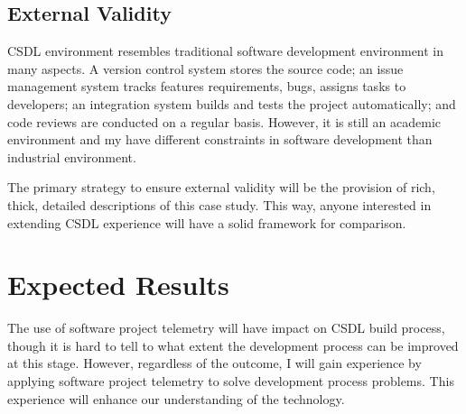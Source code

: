 \subsection{External Validity}

CSDL environment resembles traditional software development environment in many aspects. A version control system stores the source code; an issue management system tracks features requirements, bugs, assigns tasks to developers; an integration system builds and tests the project automatically; and code reviews are conducted on a regular basis. However, it is still an academic environment and my have different constraints in software development than industrial environment.

The primary strategy to ensure external validity will be the provision of rich, thick, detailed descriptions of this case study. This way, anyone interested in extending CSDL experience will have a solid framework for comparison.






\section{Expected Results}  \label{EvaluationInCSDL:Results}

The use of software project telemetry will have impact on CSDL build process, though it is hard to tell to what extent the development process can be improved at this stage. However, regardless of the outcome, I will gain experience by applying software project telemetry to solve development process problems. This experience will enhance our understanding of the technology.







%
%





